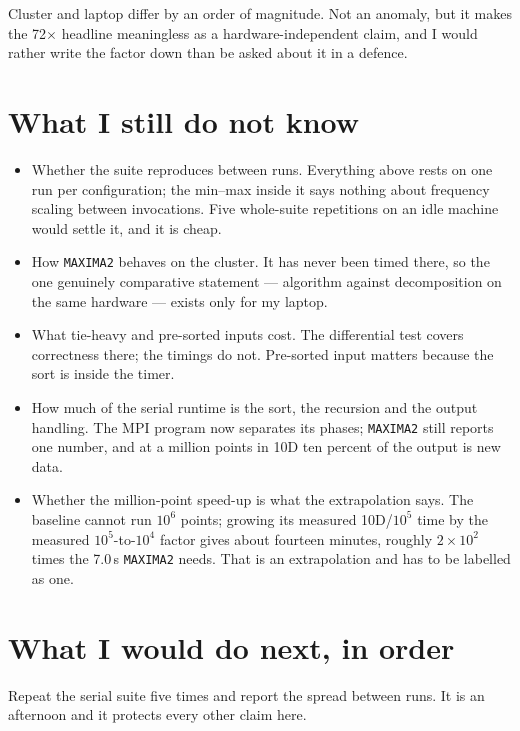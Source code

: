 \documentclass[11pt,a4paper]{article}
\newcommand{\code}[1]{\texttt{#1}}
\begin{document}
Cluster and laptop differ by an order of magnitude. Not an anomaly, but it makes
the 72$\times$ headline meaningless as a hardware-independent claim, and I would
rather write the factor down than be asked about it in a defence.

\section{What I still do not know}

\begin{itemize}
  \item Whether the suite reproduces between runs. Everything above rests on one
        run per configuration; the min--max inside it says nothing about
        frequency scaling between invocations. Five whole-suite repetitions on
        an idle machine would settle it, and it is cheap.
  \item How \code{MAXIMA2} behaves on the cluster. It has never been timed
        there, so the one genuinely comparative statement --- algorithm against
        decomposition on the same hardware --- exists only for my laptop.
  \item What tie-heavy and pre-sorted inputs cost. The differential test covers
        correctness there; the timings do not. Pre-sorted input matters because
        the sort is inside the timer.
  \item How much of the serial runtime is the sort, the recursion and the output
        handling. The MPI program now separates its phases; \code{MAXIMA2} still
        reports one number, and at a million points in 10D ten percent of the
        output is new data.
  \item Whether the million-point speed-up is what the extrapolation says. The
        baseline cannot run $10^6$ points; growing its measured 10D/$10^5$ time
        by the measured $10^5$-to-$10^4$ factor gives about fourteen minutes,
        roughly $2\times10^2$ times the 7.0\,s \code{MAXIMA2} needs. That is an
        extrapolation and has to be labelled as one.
\end{itemize}

\section{What I would do next, in order}

Repeat the serial suite five times and report the spread between runs. It is an
afternoon and it protects every other claim here.
\end{document}
